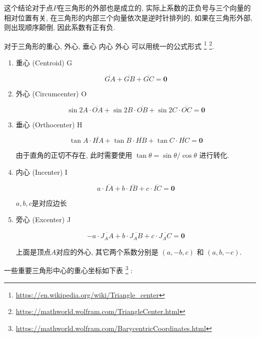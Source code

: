 这个结论对于点$P$在三角形的外部也是成立的, 实际上系数的正负号与三个向量的相对位置有关, 在三角形的内部三个向量依次是逆时针排列的,
如果在三角形外部, 则出现顺序颠倒, 因此系数有正有负.

对于三角形的重心, 外心, 垂心 内心 外心 可以用统一的公式形式
\footnote{\url{https://en.wikipedia.org/wiki/Triangle_center}}
\footnote{\url{https://mathworld.wolfram.com/TriangleCenter.html}}.

\begin{enumerate}

  \item 重心 (Centroid) G

  \[
    \overline{GA}+\overline{GB}+\overline{GC}=\boldsymbol{0}
  \]

  \item 外心 (Circumcenter) O

  \[
    \sin{2A} \cdot \overline{OA}+\sin{2B} \cdot \overline{OB}+\sin{2C} \cdot \overline{OC}=\boldsymbol{0}
  \]

  \item 垂心 (Orthocenter) H

  \[
    \tan{A} \cdot \overline{HA}+\tan{B} \cdot \overline{HB}+\tan{C} \cdot \overline{HC}=\boldsymbol{0}
  \]

  由于直角的正切不存在, 此时需要使用 $\tan{\theta} = \sin{\theta}/\cos{\theta}$ 进行转化.

  \item 内心 (Incenter) I

  \[
    a \cdot \overline{IA}+b \cdot \overline{IB}+c \cdot \overline{IC}=\boldsymbol{0}
  \]

  $a,b,c$是对应边长

  \item 旁心 (Excenter) J

  \[
    -a \cdot \overline{J_AA}+b \cdot \overline{J_AB}+c \cdot \overline{J_AC}=\boldsymbol{0}
  \]

  上面是顶点$A$对应的外心, 其它两个系数分别是 $(a,-b,c)$ 和 $(a,b,-c)$.

\end{enumerate}

一些重要三角形中心的重心坐标如下表
\footnote{\url{https://mathworld.wolfram.com/BarycentricCoordinates.html}} 
:

